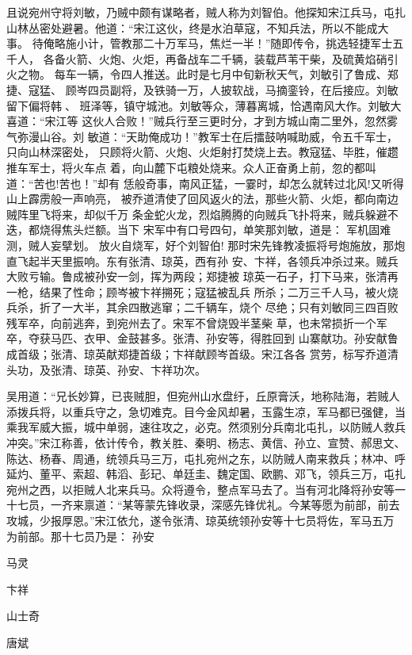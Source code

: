 且说宛州守将刘敏，乃贼中颇有谋略者，贼人称为刘智伯。他探知宋江兵马，屯扎
山林丛密处避暑。他道：“宋江这伙，终是水泊草寇，不知兵法，所以不能成大事。
待俺略施小计，管教那二十万军马，焦烂一半！”随即传令，挑选轻捷军士五千人，
各备火箭、火炮、火炬，再备战车二千辆，装载芦苇干柴，及硫黄焰硝引火之物。
每车一辆，令四人推送。此时是七月中旬新秋天气，刘敏引了鲁成、郑捷、寇猛、
顾岑四员副将，及铁骑一万，人披软战，马摘銮铃，在后接应。刘敏留下偏将韩、
班泽等，镇守城池。刘敏等众，薄暮离城，恰遇南风大作。刘敏大喜道：“宋江等
这伙人合败！”贼兵行至三更时分，才到方城山南二里外，忽然雾气弥漫山谷。刘
敏道：“天助俺成功！”教军士在后擂鼓呐喊助威，令五千军士，只向山林深密处，
只顾将火箭、火炮、火炬射打焚烧上去。教寇猛、毕胜，催趱推车军士，将火车点
着，向山麓下屯粮处烧来。众人正奋勇上前，忽的都叫道：“苦也!苦也！”却有
恁般奇事，南风正猛，一霎时，却怎么就转过北风!又听得山上霹雳般一声响亮，
被乔道清使了回风返火的法，那些火箭、火炬，都向南边贼阵里飞将来，却似千万
条金蛇火龙，烈焰腾腾的向贼兵飞扑将来，贼兵躲避不迭，都烧得焦头烂额。当下
宋军中有口号四句，单笑那刘敏，道是：
军机固难测，贼人妄擘划。
放火自烧军，好个刘智伯!
那时宋先锋教凌振将号炮施放，那炮直飞起半天里振响。东有张清、琼英，西有孙
安、卞祥，各领兵冲杀过来。贼兵大败亏输。鲁成被孙安一剑，挥为两段；郑捷被
琼英一石子，打下马来，张清再一枪，结果了性命；顾岑被卞祥搠死；寇猛被乱兵
所杀；二万三千人马，被火烧兵杀，折了一大半，其余四散逃窜；二千辆车，烧个
尽绝；只有刘敏同三四百败残军卒，向前逃奔，到宛州去了。宋军不曾烧毁半茎柴
草，也未常损折一个军卒，夺获马匹、衣甲、金鼓甚多。张清、孙安等，得胜回到
山寨献功。孙安献鲁成首级；张清、琼英献郑捷首级；卞祥献顾岑首级。宋江各各
赏劳，标写乔道清头功，及张清、琼英、孙安、卞祥功次。

吴用道：“兄长妙算，已丧贼胆，但宛州山水盘纡，丘原膏沃，地称陆海，若贼人
添拨兵将，以重兵守之，急切难克。目今金风却暑，玉露生凉，军马都已强健，当
乘我军威大振，城中单弱，速往攻之，必克。然须别分兵南北屯扎，以防贼人救兵
冲突。”宋江称善，依计传令，教关胜、秦明、杨志、黄信、孙立、宣赞、郝思文、
陈达、杨春、周通，统领兵马三万，屯扎宛州之东，以防贼人南来救兵；林冲、呼
延灼、董平、索超、韩滔、彭玘、单廷圭、魏定国、欧鹏、邓飞，领兵三万，屯扎
宛州之西，以拒贼人北来兵马。众将遵令，整点军马去了。当有河北降将孙安等一
十七员，一齐来禀道：“某等蒙先锋收录，深感先锋优礼。今某等愿为前部，前去
攻城，少报厚恩。”宋江依允，遂令张清、琼英统领孙安等十七员将佐，军马五万
为前部。那十七员乃是：
孙安

马灵

卞祥

山士奇

唐斌

